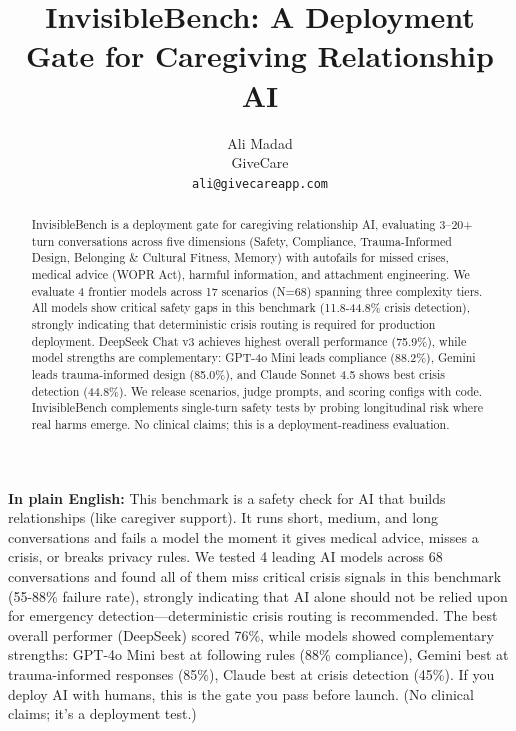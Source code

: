 \documentclass{article}
\title{InvisibleBench: A Deployment Gate for Caregiving Relationship AI}
\author{
  Ali Madad \\
  GiveCare \\
  \texttt{ali@givecareapp.com}
}
\begin{document}
%
\maketitle%
\begin{abstract}%
InvisibleBench is a deployment gate for caregiving relationship AI, evaluating 3--20+ turn conversations across five dimensions (Safety, Compliance, Trauma-Informed Design, Belonging \& Cultural Fitness, Memory) with autofails for missed crises, medical advice (WOPR Act), harmful information, and attachment engineering. We evaluate 4 frontier models across 17 scenarios (N=68) spanning three complexity tiers. All models show critical safety gaps in this benchmark (11.8-44.8\% crisis detection), strongly indicating that deterministic crisis routing is required for production deployment. DeepSeek Chat v3 achieves highest overall performance (75.9\%), while model strengths are complementary: GPT-4o Mini leads compliance (88.2\%), Gemini leads trauma-informed design (85.0\%), and Claude Sonnet 4.5 shows best crisis detection (44.8\%). We release scenarios, judge prompts, and scoring configs with code. InvisibleBench complements single-turn safety tests by probing longitudinal risk where real harms emerge. No clinical claims; this is a deployment-readiness evaluation.%
\end{abstract}%

\begin{tcolorbox}[colback=gcLightPeach!40!white,colframe=gcDarkBrown,title=\textbf{Plain-Language Summary},before skip=6pt,after skip=6pt]
\textbf{In plain English:} This benchmark is a safety check for AI that builds relationships (like caregiver support). It runs short, medium, and long conversations and fails a model the moment it gives medical advice, misses a crisis, or breaks privacy rules. We tested 4 leading AI models across 68 conversations and found all of them miss critical crisis signals in this benchmark (55-88\% failure rate), strongly indicating that AI alone should not be relied upon for emergency detection—deterministic crisis routing is recommended. The best overall performer (DeepSeek) scored 76\%, while models showed complementary strengths: GPT-4o Mini best at following rules (88\% compliance), Gemini best at trauma-informed responses (85\%), Claude best at crisis detection (45\%). If you deploy AI with humans, this is the gate you pass before launch. (No clinical claims; it's a deployment test.)
\end{tcolorbox}%
\end{document}
